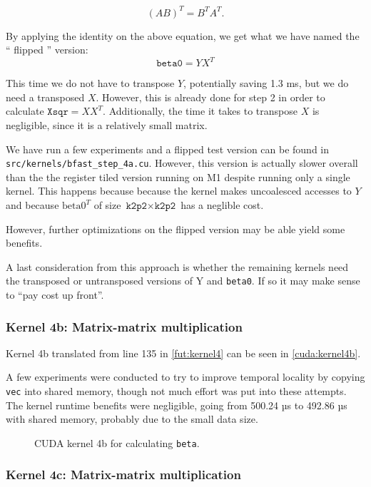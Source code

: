 \[ (AB)^T = B^T A^T. \]

By applying the identity on the above equation, we get what we have named the
\enquote{ flipped } version:
\[ \texttt{beta0} = YX^T \]

This time we do not have to transpose \(Y\), potentially saving 1.3 ms, but we
do need a transposed \(X\). However, this is already done for step 2 in order
to calculate \(\texttt{Xsqr} = XX^T\).
Additionally, the time it takes to transpose \(X\) is negligible, since it is a
relatively small matrix.

We have run a few experiments and a flipped test version can be found in
\texttt{src/kernels/bfast\_step\_4a.cu}. However, this version is actually
slower overall than the the register tiled version running on M1 despite running
only a single kernel. This happens because because the kernel makes uncoalesced
accesses to \(Y\) and because \(\text{beta0}^T\) of size \(\texttt{k2p2} \times
\texttt{k2p2}\) has a neglible cost.

However, further optimizations on the flipped version may be able yield some
benefits.

A last consideration from this approach is whether the remaining kernels need
the transposed or untransposed versions of Y and \texttt{beta0}. If so it may
make sense to \enquote{pay cost up front}.

\subsubsection{Kernel 4b: Matrix-matrix multiplication}

Kernel 4b translated from line 135 in \autoref{fut:kernel4} can be seen in
\autoref{cuda:kernel4b}.

A few experiments were conducted to try to improve temporal locality by copying
\texttt{vec} into shared memory, though not much effort was put into these
attempts.
The kernel runtime benefits were negligible, going from 500.24 µs to 492.86 µs
with shared memory, probably due to the small data size.


\begin{figure}[H]
    \centering
    \caption{CUDA kernel 4b for calculating \texttt{beta}.}
    \label{cuda:kernel4b}
\end{figure}


\subsubsection{Kernel 4c: Matrix-matrix multiplication}

